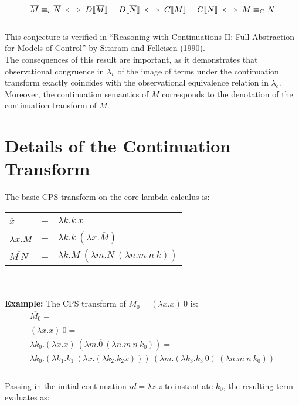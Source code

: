 \documentclass[a4paper,10pt]{article}
\begin{document}
\[
\overline{M} \equiv_v \overline{N}\\
\iff D|[ \overline{M} |] = D|[ \overline{N} |]\\
\iff C|[ M |] = C |[ N |]\\
\iff M \equiv_C N
\]
\\
This conjecture is verified in ``Reasoning with Continuations II: Full Abstraction for Models of Control''
by Sitaram and Felleisen (1990).\\

The consequences of this result are important, as it demonstrates that observational congruence
in $\lambda_v$ of the image of terms under the continuation transform exactly coincides with
the observational equivalence relation in $\lambda_c$.  Moreover, the continuation semantics of $M$
corresponds to the denotation of the continuation transform of $M$.\\

\section{Details of the Continuation Transform}

The basic CPS transform on the core lambda calculus is:

\begin{tabular}[t]{lll}
 $\overline{x}$ &=& $\lambda k . k\ x$\\
$\overline{\lambda x . M}$ &=& $\lambda k . k\ (\lambda x. \overline{M})$\\
$\overline{M\ N}$ &=& $\lambda k . \overline{M}\ (\lambda m . \overline{N}\ (\lambda n . m\ n\ k))$\\
\end{tabular}
\\
\\
\textbf{Example:} The CPS transform of $M_0 = (\lambda x . x)\ 0$ is:\\
\begin{eqnarray*}
 \overline{M_0} =\\
\overline{(\lambda x . x)\ 0}=\\
\lambda k_0 . \overline{(\lambda x . x)}\ (\lambda m . \overline{0}\ (\lambda n . m\ n\ k_0)) =\\
\lambda k_0 . (\lambda k_1 . k_1\ (\lambda x . (\lambda k_2 . k_2 x)))\ 
(\lambda m . (\lambda k_3 . k_3\ 0)\ (\lambda n . m\ n\ k_0))\\
\end{eqnarray*}
\\
Passing in the initial continuation $id = \lambda z . z$ to instantiate $k_0$, the resulting term
evaluates as:\\
\end{document}
